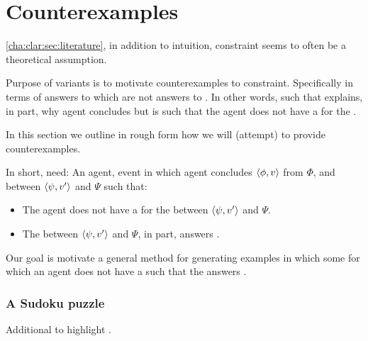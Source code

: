 \chapter{Counterexamples}
\label{cha:ces}

\begin{note}
  \autoref{cha:clar:sec:literature}, in addition to intuition, constraint seems to often be a theoretical assumption.

  Purpose of variants is to motivate counterexamples to constraint.
  Specifically in terms of answers to \qWhyV{} which are not answers to \qHowV{}.
  In other words, \ros{} such that \ros{} explains, in part, why agent concludes but is such that the agent does not have a \wit{} for the \ros{}.

  In this section we outline in rough form how we will (attempt) to provide counterexamples.

  In short, need:
  An agent, event in which agent concludes \(\langle \phi, v \rangle\) from \(\Phi\), and \ros{} between \(\langle \psi, v' \rangle\) and \(\Psi\) such that:

  \begin{itemize}
  \item
    The agent does not have a \wit{} for the \ros{} between \(\langle \psi, v' \rangle\) and \(\Psi\).
  \item
    The \ros{} between \(\langle \psi, v' \rangle\) and \(\Psi\), in part, answers \qWhyV{}.
  \end{itemize}

  Our goal is motivate a general method for generating examples in which some \ros{} for which an agent does not have a \wit{} such that the \ros{} answers \qWhyV{}.
\end{note}

\subsection{A Sudoku puzzle}

\begin{note}
  Additional  to highlight \tR{}.
\end{note}

